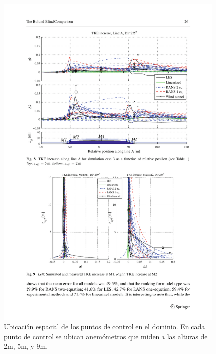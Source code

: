 \begin{figure}[H]
	\centering
	\includegraphics[width=1\linewidth,trim={1.7cm 12.3cm 0.8cm 2cm},clip]{bolund4.pdf}%
	
	\caption{Ubicación espacial de los puntos de control en el dominio. En cada punto de control se ubican anemómetros que miden a las alturas de 2m, 5m, y 9m.}
	\label{fig:an1_delta_tke}
\end{figure}

